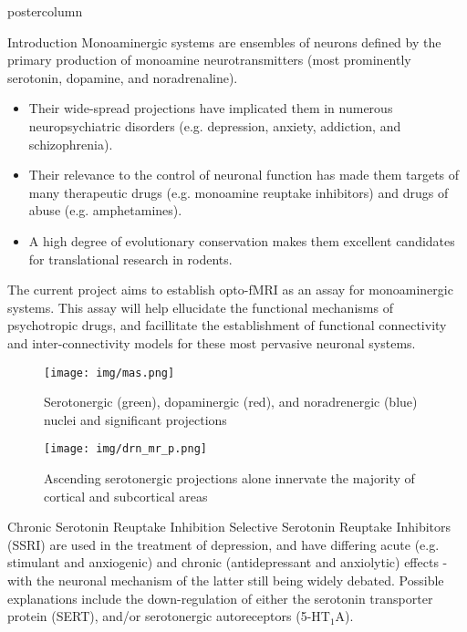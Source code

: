 \documentclass{beamer}
\begin{document}
\begin{frame}
\begin{columns}
\begin{column}{.43\textwidth}
\begin{beamercolorbox}[center]{postercolumn}
\begin{minipage}{.98\textwidth}
{\begin{myblock}{Introduction}
						Monoaminergic systems are ensembles of neurons defined by the primary production of monoamine neurotransmitters (most prominently serotonin, dopamine, and noradrenaline).
						\begin{itemize}
							\item Their wide-spread projections have implicated them in numerous neuropsychiatric disorders (e.g. depression, anxiety, addiction, and schizophrenia).
							\item Their relevance to the control of neuronal function has made them targets of many therapeutic drugs (e.g. monoamine reuptake inhibitors) and drugs of abuse (e.g. amphetamines).
							\item A high degree of evolutionary conservation makes them excellent candidates for translational research in rodents.
						\end{itemize}
						The current project aims to establish opto-fMRI as an assay for monoaminergic systems.
						This assay will help ellucidate the functional mechanisms of psychotropic drugs, and facillitate the establishment of functional connectivity and inter-connectivity models for these most pervasive neuronal systems.
						\vspace{0.4em}
						\begin{figure}
							\begin{minipage}{0.43\textwidth}
								\centering\texttt{[image: img/mas.png]}
								\caption{Serotonergic (green), dopaminergic (red), and noradrenergic (blue) nuclei and significant projections \cite{Paivi}}
							\end{minipage}
							\hspace{1em}
							\begin{minipage}{0.45\textwidth}
								\centering\texttt{[image: img/drn\_mr\_p.png]}
								\caption{Ascending serotonergic projections alone innervate the majority of cortical and subcortical areas \cite{Oegren2008}}
							\end{minipage}
						\end{figure}
					\end{myblock}\vfill
					\begin{myblock}{Chronic Serotonin Reuptake Inhibition}
						Selective Serotonin Reuptake Inhibitors (SSRI) are used in the treatment of depression, and have differing acute (e.g. stimulant and anxiogenic) and chronic (antidepressant and anxiolytic) effects - with the neuronal mechanism of the latter still being widely debated.
						Possible explanations include the down-regulation of either the serotonin transporter protein (SERT), and/or serotonergic autoreceptors (5-HT$_1$A).

\end{myblock}}
\end{minipage}
\end{beamercolorbox}
\end{column}
\end{columns}
\end{frame}
\end{document}
